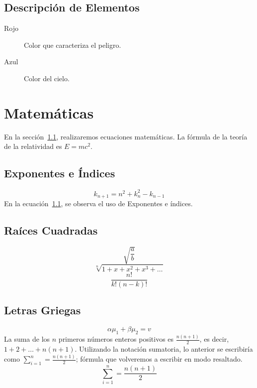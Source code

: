 \documentclass{article}
\theoremstyle{mytheoremstyle}
\theoremstyle{mytheoremstyle}
\theoremstyle{myproblemstyle}
\begin{document}
    \subsection{Descripción de Elementos}\label{SB3}
    \begin{description}
        \item[Rojo] Color que caracteriza el peligro.
        \item[Azul] Color del cielo.
    \end{description}
    
    \section{Matemáticas}\label{Sec:2}
    En la sección~\ref{EC1}, realizaremos ecuaciones matemáticas. La fórmula de la teoría de la relatividad es $E=mc^2$.
    
    \subsection{Exponentes e Índices}\label{EC1}
    \begin{equation}
        k_{n+1}=n^2 + k_n^2 - k_{n-1}
    \end{equation}
    En la ecuación~\ref{EC1}, se observa el uso de Exponentes e índices.
    
    \subsection{Raíces Cuadradas}
    \begin{equation}
        \sqrt{\frac{a}{b}}
    \end{equation}
    \begin{equation}
        \sqrt[n]{1+x+x^2+x^3+\ldots}
    \end{equation}
    \begin{equation}
        \frac{n!}{k!(n-k)!}
    \end{equation}
    
    \subsection{Letras Griegas}
    \begin{equation}
        \alpha \mu_1 + \beta \mu_2 = v
    \end{equation}
    La suma de los $n$ primeros números enteros positivos es $\frac{n(n+1)}{2}$, es decir, $1+2+\dots+n(n+1)$. Utilizando la notación sumatoria, lo anterior se escribiría como $\sum_{i=1}^{n}=\frac{n(n+1)}{2}$; fórmula que volveremos a escribir en modo resaltado.
    \[
    \sum_{i=1}^{n}=\frac{n(n+1)}{2}
    \]
    
\end{document}
